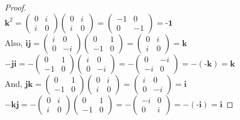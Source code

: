 \documentclass{article} %
\begin{document}
\begin{addmargin}[1em]{0em}
\begin{addmargin}[1em]{0em}
\begin{proof}
\\ $\textbf{k}^2 = \left( \begin{matrix} 0 & i \\ i & 0 \end{matrix} \right) \left( \begin{matrix} 0 & i \\ i & 0 \end{matrix} \right)  = \left( \begin{matrix} -1 & 0 \\ 0 & -1 \end{matrix} \right) = \textbf{-1}$
\\Also, $\textbf{i}\textbf{j} = \left( \begin{matrix} i & 0 \\ 0 & -i \end{matrix} \right) \left( \begin{matrix} 0 & 1 \\ -1 & 0 \end{matrix} \right) = \left( \begin{matrix} 0 & i \\ i & 0 \end{matrix} \right) = \textbf{k}$
\\ $-\textbf{j}\textbf{i} = -\left( \begin{matrix} 0 & 1 \\ -1 & 0 \end{matrix} \right) \left( \begin{matrix} i & 0 \\ 0 & -i \end{matrix} \right) = - \left( \begin{matrix} 0 & -i \\ -i & 0 \end{matrix} \right) = -(\textbf{-k}) = \textbf{k}$
\\And, $\textbf{j}\textbf{k} = \left( \begin{matrix} 0 & 1 \\ -1 & 0 \end{matrix} \right)\left( \begin{matrix} 0 & i \\ i & 0 \end{matrix} \right) = \left( \begin{matrix} i & 0 \\ 0 & -i \end{matrix} \right) = \textbf{i}$
\\ $-\textbf{k}\textbf{j} = -\left( \begin{matrix} 0 & i \\ i & 0 \end{matrix} \right)\left( \begin{matrix} 0 & 1 \\ -1 & 0 \end{matrix} \right) = -\left( \begin{matrix} -i & 0 \\ 0 & i \end{matrix} \right) = -(\textbf{-i}) = \textbf{i}$

\end{proof}
\end{addmargin}
\end{addmargin}
\end{document}
